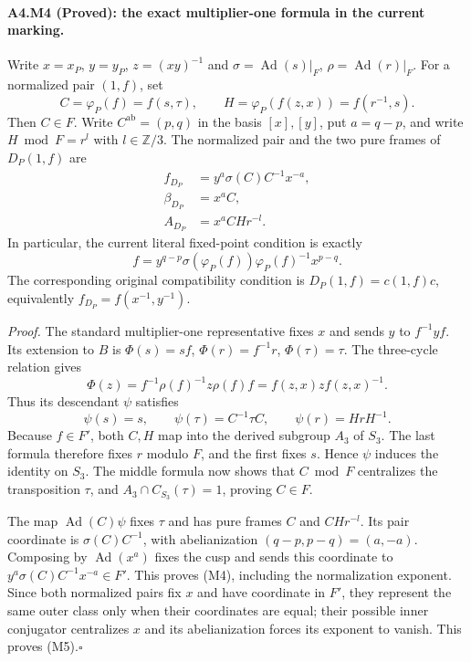 \paragraph{A4.M4 (Proved): the exact multiplier-one formula in the current marking.}
Write $x=x_P$, $y=y_P$, $z=(xy)^{-1}$ and
$\sigma=\operatorname{Ad}(s)|_F$, $\rho=\operatorname{Ad}(r)|_F$.
For a normalized pair $(1,f)$, set
\[
 C=\varphi_P(f)=f(s,\tau),\qquad
 H=\varphi_P(f(z,x))=f(r^{-1},s).
\]
Then $C\in F$. Write $C^{\mathrm{ab}}=(p,q)$ in the basis $[x],[y]$,
put $a=q-p$, and write $H\bmod F=r^l$ with $l\in\mathbb Z/3$.
The normalized pair and the two pure frames of $D_P(1,f)$ are
\[
 \begin{split}
 f_{D_P}&=y^a\sigma(C)C^{-1}x^{-a},\\
 \beta_{D_P}&=x^a C,\\
 A_{D_P}&=x^a CHr^{-l}.
 \end{split}                                                    \tag{M4}
\]
In particular, the current literal fixed-point condition is exactly
\[
             f=y^{q-p}\sigma(\varphi_P(f))\varphi_P(f)^{-1}
                    x^{p-q}.                                   \tag{M5}
\]
The corresponding original compatibility condition is
$D_P(1,f)=c(1,f)c$, equivalently
$f_{D_P}=f(x^{-1},y^{-1})$.

\emph{Proof.} The standard multiplier-one representative fixes $x$
and sends $y$ to $f^{-1}yf$. Its extension to $B$ is
$\Phi(s)=sf$, $\Phi(r)=f^{-1}r$, $\Phi(\tau)=\tau$.
The three-cycle relation gives
\[
 \Phi(z)=f^{-1}\rho(f)^{-1}z\rho(f)f
        =f(z,x)z f(z,x)^{-1}.
\]
Thus its descendant $\psi$ satisfies
\[
 \psi(s)=s,\qquad\psi(\tau)=C^{-1}\tau C,
 \qquad\psi(r)=HrH^{-1}.
\]
Because $f\in F'$, both $C,H$ map into the derived subgroup $A_3$
of $S_3$. The last formula therefore fixes $r$ modulo $F$, and the
first fixes $s$. Hence $\psi$ induces the identity on $S_3$.
The middle formula now shows that $C\bmod F$ centralizes the
transposition $\tau$, and $A_3\cap C_{S_3}(\tau)=1$, proving $C\in F$.

The map $\operatorname{Ad}(C)\psi$ fixes $\tau$ and has pure frames
$C$ and $CHr^{-l}$. Its pair coordinate is
$\sigma(C)C^{-1}$, with abelianization $(q-p,p-q)=(a,-a)$.
Composing by $\operatorname{Ad}(x^a)$ fixes the cusp and sends this
coordinate to $y^a\sigma(C)C^{-1}x^{-a}\in F'$. This proves (M4),
including the normalization exponent. Since both normalized pairs
fix $x$ and have coordinate in $F'$, they represent the same outer
class only when their coordinates are equal; their possible inner
conjugator centralizes $x$ and its abelianization forces its exponent
to vanish. This proves (M5).\hfill$\square$

